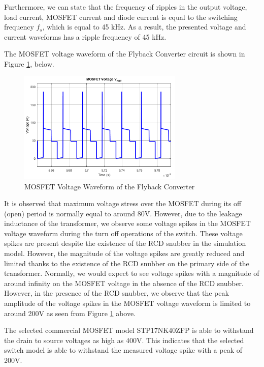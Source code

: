 Furthermore, we can state that the frequency of ripples in the output voltage, load current, MOSFET current and diode current is equal to the switching frequency $f_s$, which is equal to 45 kHz. As a result, the presented voltage and current waveforms has a ripple frequency of 45 kHz.

The MOSFET voltage waveform of the Flyback Converter circuit is shown in Figure \ref{fig:mos48}, below.

\begin{figure}[H]
\begin{center}
\includegraphics[width=0.7\textwidth]{figures/V_FET_48.png}
\caption{MOSFET Voltage Waveform of the Flyback Converter}
\label{fig:mos48}
\end{center}
\end{figure}

It is observed that maximum voltage stress over the MOSFET during its off (open) period is normally equal to around 80V. However, due to the leakage inductance of the transformer, we observe some voltage spikes in the MOSFET voltage waveform during the turn off operations of the switch. These voltage spikes are present despite the existence of the RCD snubber in the simulation model. However, the magnitude of the voltage spikes are greatly reduced and limited thanks to the existence of the RCD snubber on the primary side of the transformer. Normally, we would expect to see voltage spikes with a magnitude of around infinity on the MOSFET voltage in the absence of the RCD snubber. However, in the presence of the RCD snubber, we observe that the peak amplitude of the voltage spikes in the MOSFET voltage waveform is limited to around 200V as seen from Figure \ref{fig:mos48} above.

The selected commercial MOSFET model STP17NK40ZFP is able to withstand the drain to source voltages as high as 400V. This indicates that the selected switch model is able to withstand the measured voltage spike with a peak of 200V.


